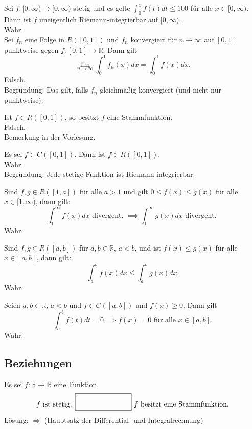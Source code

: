 Sei $f : [0, \infty)\to [0,\infty)$ stetig und es gelte $\int_{0}^{x} f(t)dt \leq 100$ für alle $x \in [0, \infty)$.
Dann ist $f$ uneigentlich Riemann-integrierbar auf $[0,\infty)$.\\
Wahr.\\

Sei $f_n$ eine Folge in $R([0,1])$ und $f_n$ konvergiert für $n \to \infty$ auf $[0,1]$ punktweise gegen $f: [0,1] \to \mathbb{R}$.
Dann gilt
\begin{displaymath}
  \lim_{n \to \infty} \int_{0}^{1} f_n(x)dx = \int_{0}^{1} f(x)dx.
\end{displaymath}
Falsch.\\
Begründung: Das gilt, falls $f_n$ gleichmäßig konvergiert (und nicht nur punktweise).

Ist $f \in R([0,1])$, so besitzt $f$ eine Stammfunktion.\\
Falsch.\\
Bemerkung in der Vorlesung.

Es sei $f \in C([0,1])$.
Dann ist $f \in R([0,1])$.\\
Wahr.\\
Begründung: Jede stetige Funktion ist Riemann-integrierbar.

Sind $f,g \in R([1,a])$ für alle $a > 1$ und gilt $0 \leq f(x) \leq g(x)$ für alle $x \in [1,\infty)$, dann gilt:
\begin{displaymath}
  \int_{1}^{\infty} f(x) dx \text{ divergent. } \implies \int_{1}^{\infty} g(x) dx \text{ divergent. }
\end{displaymath}
Wahr.

Sind $f,g \in R([a,b])$ für $a,b \in \mathbb{R}$, $a < b$, und ist $f(x) \leq g(x)$ für alle $x \in [a,b]$, dann gilt:
\begin{displaymath}
  \int_{a}^{b} f(x) dx \leq \int_{a}^{b} g(x) dx.
\end{displaymath}
Wahr.

Seien $a,b \in \mathbb{R}$, $a < b$ und $f \in C([a,b])$ und $f(x) \geq 0$.
Dann gilt
\begin{displaymath}
  \int_{a}^{b} f(t) dt = 0 \implies f(x) = 0 \text{ für alle } x \in [a,b].
\end{displaymath}
Wahr.

\subsection{Beziehungen}
Es sei $f: \mathbb{R} \to \mathbb{R}$ eine Funktion.
\begin{displaymath}
  f \text{ ist stetig. } \fbox{\rule{1in}{0pt}\rule[-0.5ex]{0pt}{4ex}} \text{ $f$ besitzt eine Stammfunktion.}
\end{displaymath}
Lösung: $\Rightarrow$ (Hauptsatz der Differential- und Integralrechnung)